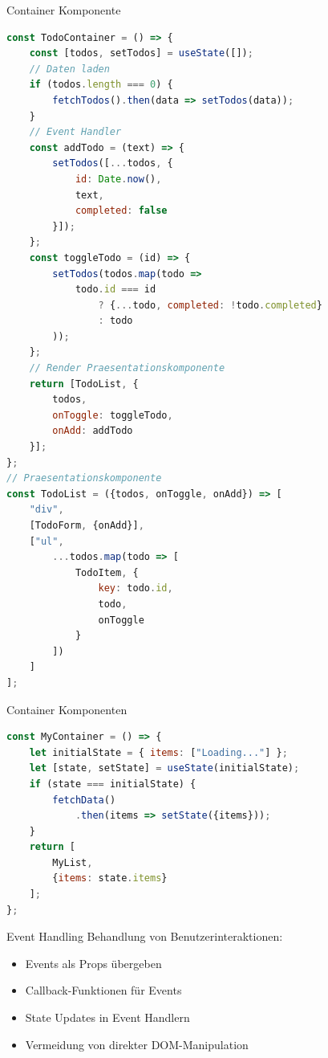 \begin{KR}{Container Komponente}
\begin{lstlisting}[language=JavaScript, style=basesmol]
const TodoContainer = () => {
    const [todos, setTodos] = useState([]);
    // Daten laden
    if (todos.length === 0) {
        fetchTodos().then(data => setTodos(data));
    }
    // Event Handler
    const addTodo = (text) => {
        setTodos([...todos, {
            id: Date.now(),
            text,
            completed: false
        }]);
    };
    const toggleTodo = (id) => {
        setTodos(todos.map(todo =>
            todo.id === id
                ? {...todo, completed: !todo.completed}
                : todo
        ));
    };
    // Render Praesentationskomponente
    return [TodoList, {
        todos,
        onToggle: toggleTodo,
        onAdd: addTodo
    }];
};
// Praesentationskomponente
const TodoList = ({todos, onToggle, onAdd}) => [
    "div",
    [TodoForm, {onAdd}],
    ["ul",
        ...todos.map(todo => [
            TodoItem, {
                key: todo.id,
                todo,
                onToggle
            }
        ])
    ]
];
\end{lstlisting}
\end{KR}

\begin{KR}{Container Komponenten}
\begin{lstlisting}[language=JavaScript, style=basesmol]
const MyContainer = () => {
    let initialState = { items: ["Loading..."] };
    let [state, setState] = useState(initialState);
    if (state === initialState) {
        fetchData()
            .then(items => setState({items}));
    }
    return [
        MyList, 
        {items: state.items}
    ];
};
\end{lstlisting}
\end{KR}



\begin{concept}{Event Handling}
    Behandlung von Benutzerinteraktionen:
    \begin{itemize}
        \item Events als Props übergeben
        \item Callback-Funktionen für Events
        \item State Updates in Event Handlern
        \item Vermeidung von direkter DOM-Manipulation
    \end{itemize}
\end{concept}


